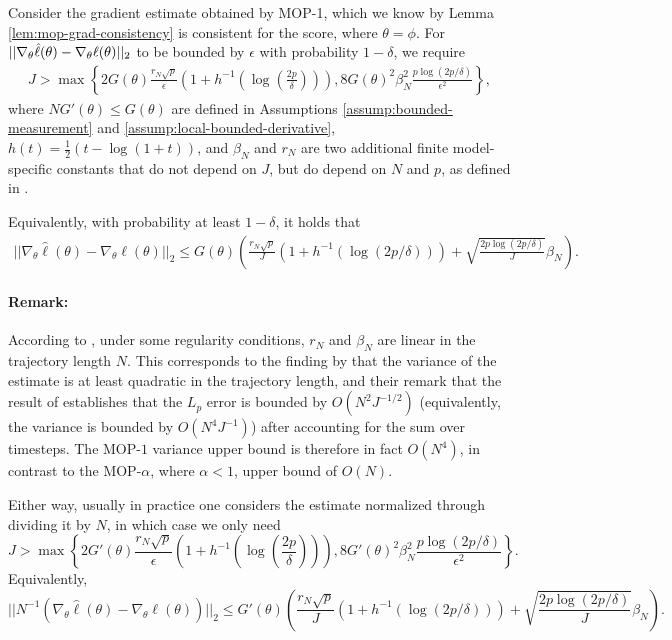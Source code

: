 \documentclass{article}
\begin{document}
\begin{lem}
    \label{lemma:grad_bound}
    Consider the gradient estimate obtained by MOP-1, which we know by Lemma \ref{lem:mop-grad-consistency} is consistent for the score, where $\theta = \phi$. For $||\nabla_\theta \hat{\ell}(\theta) - \nabla_\theta \ell(\theta)||_2$ to be bounded by $\epsilon$ with probability $1-\delta$, we require
    \begin{align}
    J > \max\left\{2G(\theta)\frac{r_N\sqrt{p}}{\epsilon}\left(1+h^{-1}\left(\log\left(\frac{2p}{\delta}\right)\right)\right), 8G(\theta)^2\beta_N^2\frac{p\log(2p/\delta)}{\epsilon^2}\right\},
    \end{align}
    where $NG'(\theta) \leq G(\theta)$ are defined in Assumptions \ref{assump:bounded-measurement} and \ref{assump:local-bounded-derivative}, $h(t) = \frac{1}{2}(t - \log(1+t))$, and $\beta_N$ and $r_N$ are two additional finite model-specific constants that do not depend on $J$, but do depend on $N$ and $p$, as defined in \cite{delmoral2011ci}. 

    Equivalently, with probability at least $1-\delta$, it holds that
    \begin{align}
        ||\nabla_\theta \hat\ell(\theta) - \nabla_\theta \ell(\theta)||_2 \leq G(\theta)\left(\frac{r_N\sqrt{p}}{J}(1+h^{-1}(\log(2p/\delta))) + \sqrt{\frac{2p\log(2p/\delta)}{J}}\beta_N\right).
    \end{align}
\end{lem}

\paragraph{Remark:} According to \cite{delmoral2011ci}, under some regularity conditions, $r_N$ and $\beta_N$ are linear in the trajectory length $N$. This corresponds to the finding by \cite{poyiadjis11} that the variance of the estimate is at least quadratic in the trajectory length, and their remark that the result of \cite{delMoral03} establishes that the $L_p$ error is bounded by $O(N^2J^{-1/2})$ (equivalently, the variance is bounded by $O(N^4J^{-1})$) after accounting for the sum over timesteps. The MOP-$1$ variance upper bound is therefore in fact $O(N^4)$, in contrast to the MOP-$\alpha$, where $\alpha<1$, upper bound of $O(N)$. 

Either way, usually in practice one considers the estimate normalized through dividing it by $N$, in which case we only need
$$J > \max\left\{2G'(\theta)\frac{r_N\sqrt{p}}{\epsilon}\left(1+h^{-1}\left(\log\left(\frac{2p}{\delta}\right)\right)\right), 8G'(\theta)^2\beta_N^2\frac{p\log(2p/\delta)}{\epsilon^2}\right\}.$$
Equivalently,
$$||N^{-1}(\nabla_\theta \hat\ell(\theta) - \nabla_\theta \ell(\theta))||_2 \leq G'(\theta)\left(\frac{r_N\sqrt{p}}{J}(1+h^{-1}(\log(2p/\delta))) + \sqrt{\frac{2p\log(2p/\delta)}{J}}\beta_N\right).$$
\end{document}
